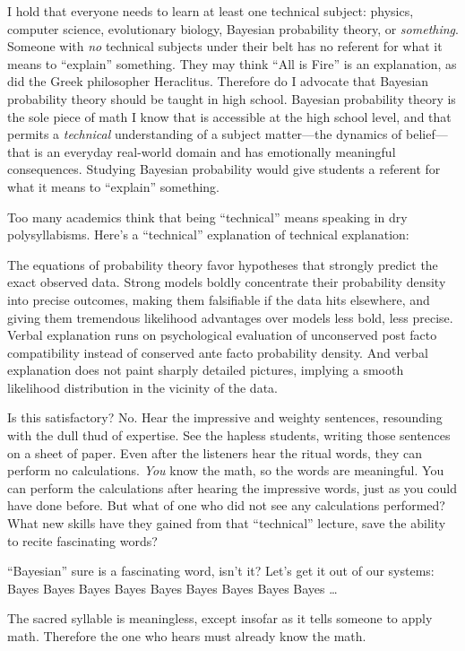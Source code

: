 {
 I hold that everyone needs to learn at least one technical
subject: physics, computer science, evolutionary biology, Bayesian
probability theory, or \textit{something}. Someone with \textit{no}
technical subjects under their belt has no referent for what it means
to ``explain'' something. They may
think ``All is Fire'' is an
explanation, as did the Greek philosopher Heraclitus. Therefore do I
advocate that Bayesian probability theory should be taught in high
school. Bayesian probability theory is the sole piece of math I know
that is accessible at the high school level, and that permits a
\textit{technical} understanding of a subject matter---the dynamics of
belief---that is an everyday real-world domain and has emotionally
meaningful consequences. Studying Bayesian probability would give
students a referent for what it means to
``explain'' something.}

{
 Too many academics think that being
``technical'' means speaking in dry
polysyllabisms. Here's a
``technical'' explanation of
technical explanation:}

{
 The equations of probability theory favor hypotheses that strongly
predict the exact observed data. Strong models boldly concentrate their
probability density into precise outcomes, making them falsifiable if
the data hits elsewhere, and giving them tremendous likelihood
advantages over models less bold, less precise. Verbal explanation runs
on psychological evaluation of unconserved post facto compatibility
instead of conserved ante facto probability density. And verbal
explanation does not paint sharply detailed pictures, implying a smooth
likelihood distribution in the vicinity of the data.}

{
 Is this satisfactory? No. Hear the impressive and weighty
sentences, resounding with the dull thud of expertise. See the hapless
students, writing those sentences on a sheet of paper. Even after the
listeners hear the ritual words, they can perform no calculations.
\textit{You} know the math, so the words are meaningful. You can
perform the calculations after hearing the impressive words, just as
you could have done before. But what of one who did not see any
calculations performed? What new skills have they gained from that
``technical'' lecture, save the
ability to recite fascinating words?}

{
 ``Bayesian'' sure is a
fascinating word, isn't it? Let's get
it out of our systems: Bayes Bayes Bayes Bayes Bayes Bayes Bayes Bayes
Bayes \ldots}

{
 The sacred syllable is meaningless, except insofar as it tells
someone to apply math. Therefore the one who hears must already know
the math.}

